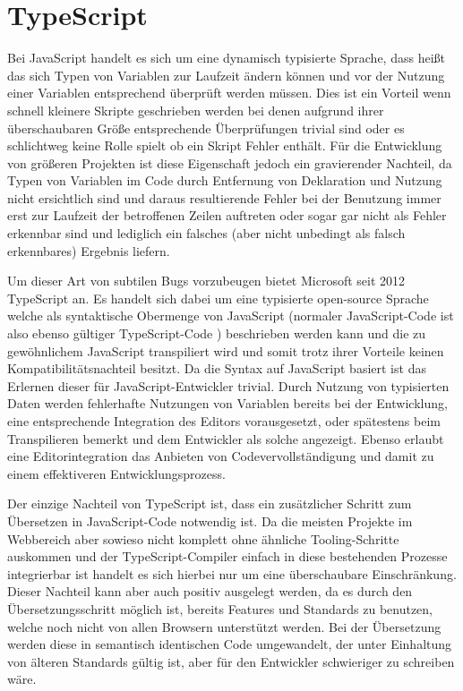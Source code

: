 \section{TypeScript}
Bei JavaScript handelt es sich um eine dynamisch typisierte Sprache, dass heißt das sich Typen von Variablen zur Laufzeit ändern können und vor der Nutzung einer Variablen entsprechend überprüft werden müssen. Dies ist ein Vorteil wenn schnell kleinere Skripte geschrieben werden bei denen aufgrund ihrer überschaubaren Größe entsprechende Überprüfungen trivial sind oder es schlichtweg keine Rolle spielt ob ein Skript Fehler enthält. Für die Entwicklung von größeren Projekten ist diese Eigenschaft jedoch ein gravierender Nachteil, da Typen von Variablen im Code durch Entfernung von Deklaration und Nutzung nicht ersichtlich sind und daraus resultierende Fehler bei der Benutzung immer erst zur Laufzeit der betroffenen Zeilen auftreten oder sogar gar nicht als Fehler erkennbar sind und lediglich ein falsches (aber nicht unbedingt als falsch erkennbares) Ergebnis liefern.   

Um dieser Art von subtilen Bugs vorzubeugen bietet Microsoft seit 2012 TypeScript an. Es handelt sich dabei um eine typisierte open-source Sprache welche als syntaktische Obermenge von JavaScript (normaler JavaScript-Code ist also ebenso gültiger TypeScript-Code ) beschrieben werden kann und die zu gewöhnlichem JavaScript transpiliert  wird und somit trotz ihrer Vorteile keinen Kompatibilitätsnachteil besitzt. Da die Syntax auf JavaScript basiert ist das Erlernen dieser für JavaScript-Entwickler trivial. Durch Nutzung von typisierten Daten werden fehlerhafte Nutzungen von Variablen bereits bei der Entwicklung, eine entsprechende Integration des Editors vorausgesetzt, oder spätestens beim Transpilieren bemerkt und dem Entwickler als solche angezeigt. Ebenso erlaubt eine Editorintegration das Anbieten von Codevervollständigung und damit zu einem effektiveren Entwicklungsprozess.

Der einzige Nachteil von TypeScript ist, dass ein zusätzlicher Schritt zum Übersetzen in JavaScript-Code notwendig ist. Da die meisten Projekte im Webbereich aber sowieso nicht komplett ohne ähnliche Tooling-Schritte auskommen und der TypeScript-Compiler einfach in diese bestehenden Prozesse integrierbar ist handelt es sich hierbei nur um eine überschaubare Einschränkung. Dieser Nachteil kann aber auch positiv ausgelegt werden, da es durch den Übersetzungsschritt möglich ist, bereits Features und Standards zu benutzen, welche noch nicht von allen Browsern unterstützt werden. Bei der Übersetzung werden diese in semantisch identischen Code umgewandelt, der unter Einhaltung von älteren Standards gültig ist, aber für den Entwickler schwieriger zu schreiben wäre. 


